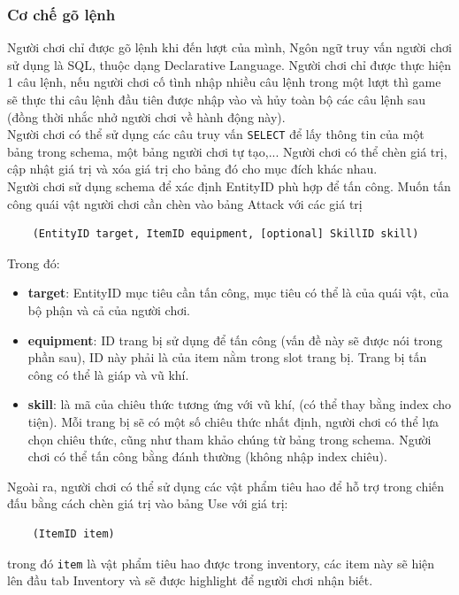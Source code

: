 \subsubsection{Cơ chế gõ lệnh}
\hspace*{1cm}Người chơi chỉ được gõ lệnh khi đến lượt của mình, Ngôn ngữ truy vấn người chơi sử dụng là SQL, thuộc dạng Declarative Language. Người chơi chỉ được thực hiện 1 câu lệnh, nếu người chơi cố tình nhập nhiều câu lệnh trong một lượt thì game sẽ thực thi câu lệnh đầu tiên được nhập vào và hủy toàn bộ các câu lệnh sau (đồng thời nhắc nhở người chơi về hành động này).\\
\hspace*{1cm} Người chơi có thể sử dụng các câu truy vấn \texttt{SELECT} để lấy thông tin của một bảng trong schema, một bảng người chơi tự tạo,... Người chơi có thể chèn giá trị, cập nhật giá trị và xóa giá trị cho bảng đó cho mục đích khác nhau.\\
\hspace*{1cm} Người chơi sử dụng schema để xác định EntityID phù hợp để tấn công. Muốn tấn công quái vật người chơi cần chèn vào bảng Attack với các giá trị 
\begin{verbatim}
	(EntityID target, ItemID equipment, [optional] SkillID skill)
\end{verbatim}
Trong đó:
\begin{itemize}
	\item \textbf{target}: EntityID mục tiêu cần tấn công, mục tiêu có thể là của quái vật, của bộ phận và cả của người chơi.
	\item \textbf{equipment}: ID trang bị sử dụng để tấn công (vấn đề này sẽ được nói trong phần sau), ID này phải là của item nằm trong slot trang bị. Trang bị tấn công có thể là giáp và vũ khí.
	\item \textbf{skill}: là mã của chiêu thức tương ứng với vũ khí, (có thể thay bằng index cho tiện). Mỗi trang bị sẽ có một số chiêu thức nhất định, người chơi có thể lựa chọn chiêu thức, cũng như tham khảo chúng từ bảng trong schema. Người chơi có thể tấn công bằng đánh thường (không nhập index chiêu).
\end{itemize}

Ngoài ra, người chơi có thể sử dụng các vật phẩm tiêu hao để hỗ trợ trong chiến đấu bằng cách chèn giá trị vào bảng Use với giá trị:
\begin{verbatim}
	(ItemID item)
\end{verbatim}
trong đó \texttt{item} là vật phẩm tiêu hao được trong inventory, các item này sẽ hiện lên đầu tab Inventory và sẽ được highlight để người chơi nhận biết.


